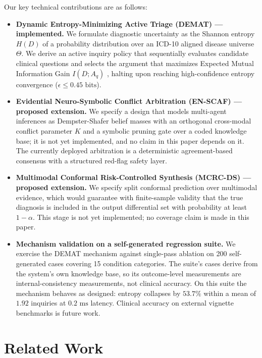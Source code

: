 \documentclass[10pt,twocolumn]{article}
\begin{document}
Our key technical contributions are as follows:
\begin{itemize}
    \item \textbf{Dynamic Entropy-Minimizing Active Triage (DEMAT) — implemented.} We formulate diagnostic uncertainty as the Shannon entropy $H(D)$ of a probability distribution over an ICD-10 aligned disease universe $\Theta$. We derive an active inquiry policy that sequentially evaluates candidate clinical questions and selects the argument that maximizes Expected Mutual Information Gain $I(D; A_q)$ \cite{shannon1948mathematical}, halting upon reaching high-confidence entropy convergence ($\epsilon \le 0.45\text{ bits}$).
    \item \textbf{Evidential Neuro-Symbolic Conflict Arbitration (EN-SCAF) — proposed extension.} We specify a design that models multi-agent inferences as Dempster-Shafer belief masses \cite{dempster1967upper, shafer1976mathematical} with an orthogonal cross-modal conflict parameter $K$ and a symbolic pruning gate over a coded knowledge base; it is not yet implemented, and no claim in this paper depends on it. The currently deployed arbitration is a deterministic agreement-based consensus with a structured red-flag safety layer.
    \item \textbf{Multimodal Conformal Risk-Controlled Synthesis (MCRC-DS) — proposed extension.} We specify split conformal prediction \cite{vovk2005algorithmic, angelopoulos2021gentle} over multimodal evidence, which would guarantee with finite-sample validity that the true diagnosis is included in the output differential set with probability at least $1 - \alpha$. This stage is not yet implemented; no coverage claim is made in this paper.
    \item \textbf{Mechanism validation on a self-generated regression suite.} We exercise the DEMAT mechanism against single-pass ablation on 200 self-generated cases covering 15 condition categories. The suite's cases derive from the system's own knowledge base, so its outcome-level measurements are internal-consistency measurements, not clinical accuracy. On this suite the mechanism behaves as designed: entropy collapses by $53.7\%$ within a mean of $1.92$ inquiries at $0.2\text{ ms}$ latency. Clinical accuracy on external vignette benchmarks is future work.
\end{itemize}

\section{Related Work}
\end{document}
